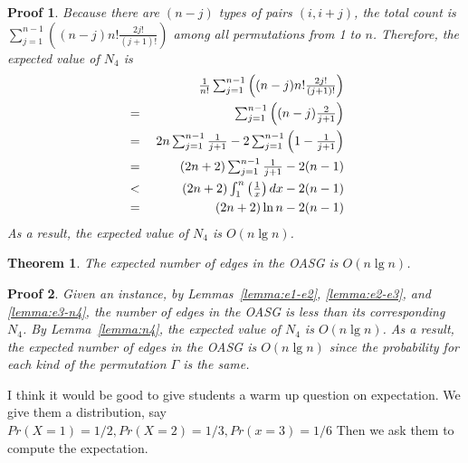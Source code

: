 \documentclass[]{article}
\newtheorem{Proof}{Proof}
\newtheorem{Theorem}{Theorem}
\begin{document}
\begin{qunlist}
{{\begin{Proof}
Because there are $(n-j)$ types of pairs $(i,i+j)$, the total count is $\sum_{j=1}^{n-1}((n-j)n!\frac{2j!}{(j+1)!})$ among all permutations from 1 to $n$. Therefore, the expected value of $N_4$ is
\begin{eqnarray*}
 & {\textstyle        } & {\textstyle \frac{1}{n!}\sum_{j=1}^{n-1}\left((n-j)n!\frac{2j!}{(j+1)!}\right)}            \nonumber\\
 & {\textstyle { }={ }} & {\textstyle \sum_{j=1}^{n-1}\left((n-j)\frac{2}{j+1}\right)}                               \nonumber\\
 & {\textstyle { }={ }} & {\textstyle 2n\sum_{j=1}^{n-1}\frac{1}{j+1}-2\sum_{j=1}^{n-1}\left(1-\frac{1}{j+1}\right)} \nonumber\\
 & {\textstyle { }={ }} & {\textstyle (2n+2)\sum_{j=1}^{n-1}\frac{1}{j+1}-2(n-1)}                                    \nonumber\\
 & {\textstyle { }<{ }} & {\textstyle (2n+2)\int_1^n\left(\frac{1}{x}\right)dx-2(n-1)}                             \nonumber\\
 & {\textstyle { }={ }} & {\textstyle (2n+2)\ln n-2(n-1)}                                                           \nonumber
\end{eqnarray*}
As a result, the expected value of $N_4$ is $O(n\lg n)$.
\end{Proof}

\begin{Theorem}\label{theorem:edge-random-case}
The expected number of edges in the OASG is $O(n\lg n)$.
\end{Theorem}

\begin{Proof}
Given an instance, by Lemmas~\ref{lemma:e1-e2}, \ref{lemma:e2-e3}, and \ref{lemma:e3-n4}, the number of edges in the OASG is less than its corresponding $N_4$. By Lemma~\ref{lemma:n4}, the expected value of $N_4$ is $O(n\lg n)$. As a result, the expected number of edges in the OASG is $O(n\lg n)$ since the probability for each kind of the permutation $\Gamma$ is the same.
\end{Proof}
}} \fi



 
 I think it would be good to give students a warm up question on expectation. We give them a distribution, say $Pr(X = 1) = 1/2, Pr (X=2) = 1/3, Pr (x=3) = 1/6$ Then we ask them to compute the expectation.
 

\end{qunlist}
\end{document}
